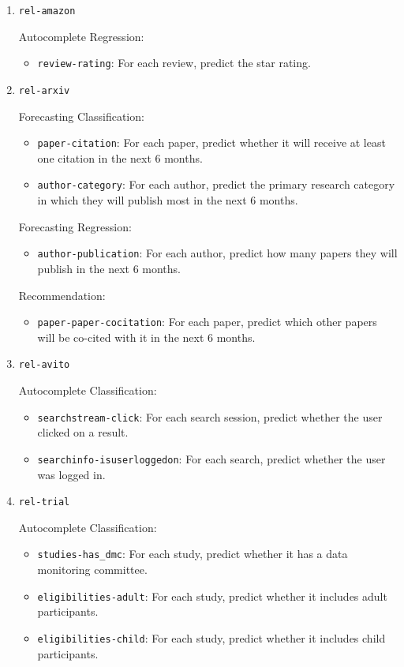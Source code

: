 \begin{enumerate}
  \item \texttt{rel-amazon}
    
    Autocomplete Regression:
    \begin{itemize}
      \item \texttt{review-rating}: For each review, predict the star rating.
    \end{itemize}


  \item \texttt{rel-arxiv}

  Forecasting Classification:
  \begin{itemize}
    \item \texttt{paper-citation}: For each paper, predict whether it will receive at least one citation in the next 6 months.
    \item \texttt{author-category}: For each author, predict the primary research category in which they will publish most in the next 6 months.
  \end{itemize}

  Forecasting Regression:
  \begin{itemize}
    \item \texttt{author-publication}: For each author, predict how many papers they will publish in the next 6 months.
  \end{itemize}

  Recommendation:
  \begin{itemize}
    \item \texttt{paper-paper-cocitation}: For each paper, predict which other papers will be co-cited with it in the next 6 months.
  \end{itemize}

  \item \texttt{rel-avito}

  Autocomplete Classification:
  \begin{itemize}
    \item \texttt{searchstream-click}: For each search session, predict whether the user clicked on a result.
    \item \texttt{searchinfo-isuserloggedon}: For each search, predict whether the user was logged in.
  \end{itemize}


  \item \texttt{rel-trial}

  Autocomplete Classification:
  \begin{itemize}
    \item \texttt{studies-has\_dmc}: For each study, predict whether it has a data monitoring committee.
    \item \texttt{eligibilities-adult}: For each study, predict whether it includes adult participants.
    \item \texttt{eligibilities-child}: For each study, predict whether it includes child participants.
  \end{itemize}


\end{enumerate}
